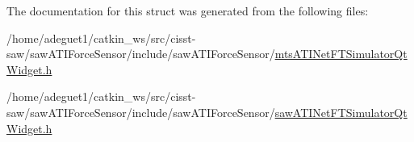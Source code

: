 The documentation for this struct was generated from the following files\-:\begin{DoxyCompactItemize}
\item 
/home/adeguet1/catkin\-\_\-ws/src/cisst-\/saw/saw\-A\-T\-I\-Force\-Sensor/include/saw\-A\-T\-I\-Force\-Sensor/\hyperlink{mts_a_t_i_net_f_t_simulator_qt_widget_8h}{mts\-A\-T\-I\-Net\-F\-T\-Simulator\-Qt\-Widget.\-h}\item 
/home/adeguet1/catkin\-\_\-ws/src/cisst-\/saw/saw\-A\-T\-I\-Force\-Sensor/include/saw\-A\-T\-I\-Force\-Sensor/\hyperlink{saw_a_t_i_net_f_t_simulator_qt_widget_8h}{saw\-A\-T\-I\-Net\-F\-T\-Simulator\-Qt\-Widget.\-h}\end{DoxyCompactItemize}
